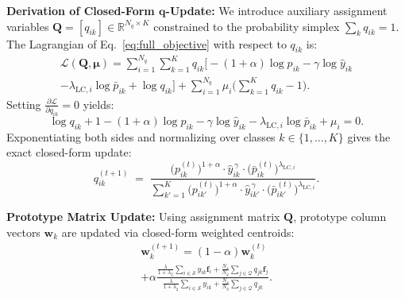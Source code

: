 \noindent \textbf{Derivation of Closed-Form $\bm{q}$-Update:} We introduce auxiliary assignment variables $\mathbf{Q} = [q_{ik}] \in \mathbb{R}^{N_q \times K}$ constrained to the probability simplex $\sum_k q_{ik} = 1$. The Lagrangian of Eq.~\eqref{eq:full_objective} with respect to $q_{ik}$ is:
\begin{equation}
\begin{split}
    \mathcal{L}(\mathbf{Q}, \bm{\mu}) = \sum_{i=1}^{N_q} \sum_{k=1}^K q_{ik} \Big[ -(1+\alpha)\log p_{ik} - \gamma \log \hat{y}_{ik} \\
    - \lambda_{\text{LC}, i} \log \bar{p}_{ik} + \log q_{ik} \Big] + \sum_{i=1}^{N_q} \mu_i \Big(\sum_{k=1}^K q_{ik} - 1\Big).
\end{split}
    \label{eq:lagrangian}
\end{equation}
Setting $\frac{\partial \mathcal{L}}{\partial q_{ik}} = 0$ yields:
\begin{equation}
    \log q_{ik} + 1 - (1+\alpha)\log p_{ik} - \gamma \log \hat{y}_{ik} - \lambda_{\text{LC}, i} \log \bar{p}_{ik} + \mu_i = 0.
\end{equation}
Exponentiating both sides and normalizing over classes $k \in \{1,\dots,K\}$ gives the exact closed-form update:
\begin{equation}
    q^{(t+1)}_{ik} \;=\; \frac{\big(p^{(t)}_{ik}\big)^{1+\alpha} \cdot \hat{y}_{ik}^{\,\gamma} \cdot \big(\bar{p}^{(t)}_{ik}\big)^{\lambda_{\text{LC}, i}}}{\sum_{k'=1}^K \big(p^{(t)}_{ik'}\big)^{1+\alpha} \cdot \hat{y}_{ik'}^{\,\gamma} \cdot \big(\bar{p}^{(t)}_{ik'}\big)^{\lambda_{\text{LC}, i}}}.
    \label{eq:q_update}
\end{equation}

\noindent \textbf{Prototype Matrix Update:} Using assignment matrix $\mathbf{Q}$, prototype column vectors $\bm{w}_k$ are updated via closed-form weighted centroids:
\begin{equation}
\begin{split}
    \bm{w}_k^{(t+1)} = (1-\alpha) \bm{w}_k^{(t)} \\
    + \alpha \frac{\frac{\lambda}{1+\lambda_2} \sum_{i \in \mathcal{S}} y_{ik} \bm{f}_i + \frac{N_s}{N_q} \sum_{j \in \mathcal{Q}} q_{jk} \bm{f}_j}{\frac{\lambda}{1+\lambda_2} \sum_{i \in \mathcal{S}} y_{ik} + \frac{N_s}{N_q} \sum_{j \in \mathcal{Q}} q_{jk}}.
\end{split}
    \label{eq:w_update}
\end{equation}

